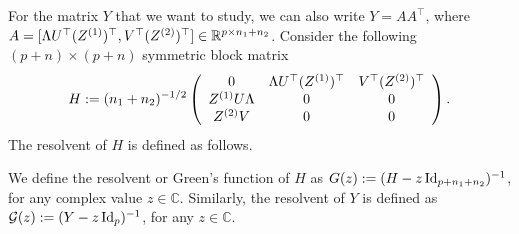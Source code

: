 For the matrix $Y$ that we want to study, we can also write $Y = A A^{\top}$, where $A = [\Lambda U^\top (Z^{(1)})^\top,V^\top (Z^{(2)})^\top] \in \mathbb{R}^{p\times {n_1 + n_2}}$.
Consider the following $(p+n)\times (p+n)$ symmetric block matrix
 \begin{equation}\label{linearize_block}
    H \define (n_1 + n_2)^{-1/2}\left( {\begin{array}{*{20}c}
   { 0 } & \Lambda U^{\top}(Z^{(1)})^\top & V^\top (Z^{(2)})^\top  \\
   {Z^{(1)} U\Lambda  } & {0} & 0 \\
   {Z^{(2)}V} & 0 & 0
   \end{array}} \right).
 \end{equation}
The resolvent of $H$ is defined as follows.
\begin{definition}[Resolvents]
We define the resolvent or Green's function of $H$ as
 $G(z) := (H - z\operatorname{Id}_{p + n_1 + n_2})^{-1}$, for any complex value $z\in \mathbb C$.  %
Similarly, the resolvent of $Y$ is defined as $\mathcal G(z):=(Y - z\operatorname{Id}_{p})^{-1}$, for any $z\in \mathbb C$.
\end{definition}

